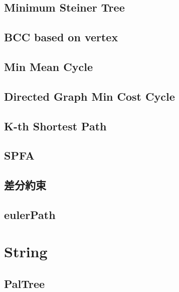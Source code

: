 \documentclass[a4paper,10pt,twocolumn,oneside]{article}
\begin{document}
\subsection{Minimum Steiner Tree}


\subsection{BCC based on vertex}


\subsection{Min Mean Cycle}


\subsection{Directed Graph Min Cost Cycle}


\subsection{K-th Shortest Path}


\subsection{SPFA}


\subsection{差分約束}

%

\subsection{eulerPath}


\section{String}
\subsection{PalTree}

\end{document}

